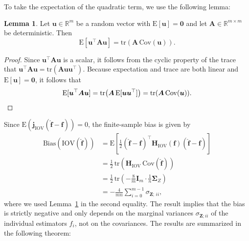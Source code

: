 ﻿\documentclass[12pt,a4paper]{scrreprt}
\theoremstyle{definition}
\newtheorem{lemma}[theorem]{Lemma}
\begin{document}
To take the expectation of the quadratic term, we use the following lemma: 
\begin{lemma}\label{lem:quadform}
Let $\boldsymbol{u} \in \mathbb{R}^m$ be a random vector with
$\mathrm{E}[\boldsymbol{u}] = \boldsymbol{0}$ and let  
$\boldsymbol{A} \in \mathbb{R}^{m \times m}$ be deterministic. Then
\[
\mathrm{E}[\boldsymbol{u}^\top \boldsymbol{A}\boldsymbol{u}] 
= \mathrm{tr}(\boldsymbol{A}\,\mathrm{Cov}(\boldsymbol{u})).
\]
\end{lemma}
\begin{proof}
Since $\boldsymbol{u}^\top \boldsymbol{A}\boldsymbol{u}$ is a scalar, 
it follows from the cyclic property of the trace 
\citep[Theorem~1.5]{Banerjee2014} that
$\boldsymbol{u}^\top \boldsymbol{A}\boldsymbol{u} 
= \mathrm{tr}(\boldsymbol{A}\boldsymbol{u}\boldsymbol{u}^\top)$.
Because expectation and trace are both linear and 
$\mathrm{E}[\boldsymbol{u}] = \boldsymbol{0}$, it follows that
\[
\mathrm{E}[\boldsymbol{u}^\top \boldsymbol{A}\boldsymbol{u}]
= \mathrm{tr}\bigl(\boldsymbol{A}\,\mathrm{E}[\boldsymbol{u}\boldsymbol{u}^\top]\bigr)
= \mathrm{tr}(\boldsymbol{A}\,\mathrm{Cov}(\boldsymbol{u})). \qedhere
\]
\end{proof}
\noindent Since $\mathrm{E}(\boldsymbol{j}_{\mathrm{IOV}} (\hat{\boldsymbol{f}} - \boldsymbol{f})) = 0$,
the finite-sample bias is given by
\begin{align*}
    \mathrm{Bias}(\mathrm{IOV}(\hat{\boldsymbol{f}})) 
    &= \mathrm{E}\!\left[\frac{1}{2}(\hat{\boldsymbol{f}}- \boldsymbol{f})^\top 
    \boldsymbol{H}_{\mathrm{IOV}}(\boldsymbol{f})(\hat{\boldsymbol{f}}- \boldsymbol{f})\right] \\
    &= \frac{1}{2}\,\mathrm{tr}\!\left(\boldsymbol{H}_{\mathrm{IOV}}\,
    \mathrm{Cov}(\hat{\boldsymbol{f}})\right) \\
    &= \frac{1}{2}\,\mathrm{tr}\!\left(-\frac{8}{m}\boldsymbol{I}_m \cdot 
    \frac{1}{n}\boldsymbol{\Sigma}_Z\right) \\
    &= -\frac{4}{mn} \sum_{i=0}^{m-1} \sigma_{\boldsymbol{Z};\,ii},
\end{align*}
\noindent where we used Lemma~\ref{lem:quadform} in the second equality. The result implies that the bias is strictly negative and only depends on the marginal variances 
$\sigma_{\boldsymbol{Z}; ii}$ of the individual estimators $f_i$,  not on the covariances. 
The results are summarized in the following theorem: \\
\end{document}
